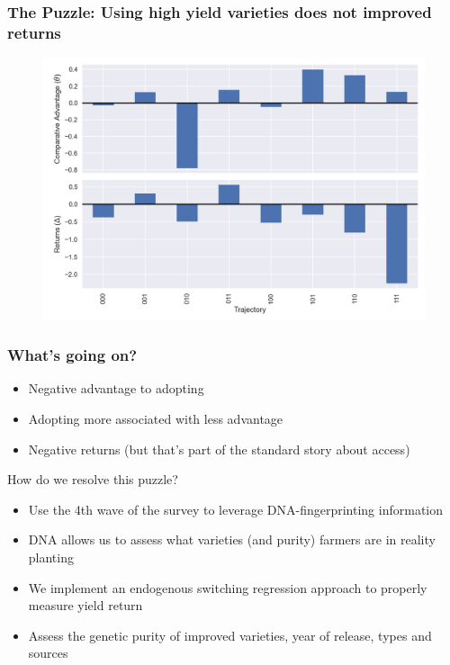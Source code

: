 \documentclass{beamer}
\begin{document}
\begin{frame}
\frametitle{The Puzzle: Using high yield varieties does not improved returns}

\begin{figure}
    \centering
    \includegraphics[scale=0.5]{results/figures/theta.png}\label{fig:theta_delta_raw}
\end{figure}
 
\end{frame}


\begin{frame}
\frametitle{What's going on?}

\begin{itemize}
    \item Negative advantage to adopting
    \item Adopting more associated with less advantage
    \item Negative returns (but that's part of the standard story about access)
\end{itemize}

\end{frame}

\begin{frame}{How do we resolve this puzzle?}
\begin{itemize}
    \item Use the  4th wave of the survey to leverage DNA-fingerprinting information 
    \item DNA allows us to assess what varieties (and purity) farmers are in reality planting  
    \item We implement an endogenous switching regression approach to properly measure yield return 
    \item Assess the genetic purity of improved varieties, year of release, types and sources
\end{itemize}


\end{frame}
\end{document}
